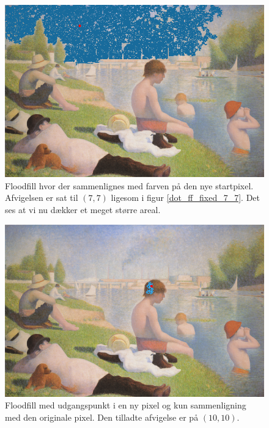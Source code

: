 {\begin{figure}[!h]
    \begin{center}
        \includegraphics[scale=0.49]{afsnit/vores_implementation/billeder/flood_fill/dot_ff_var_7_7}
    \end{center}
    \caption[]{Floodfill hvor der sammenlignes med farven på den nye
    startpixel. Afvigelsen er sat til $(7,7)$ ligesom i figur
    \ref{dot_ff_fixed_7_7}. Det ses at vi nu dækker et meget større
    areal.}
    \label{dot_ff_var_7_7}
\end{figure}

\begin{figure}[!h]
    \begin{center}
        \includegraphics[scale=0.49]{afsnit/vores_implementation/billeder/flood_fill/dot_ff_fixed_10_10}
    \end{center}
    \caption[]{Floodfill med udgangspunkt i en ny pixel og kun
    sammenligning med den originale pixel. Den tilladte afvigelse er på
    $(10,10)$.}
    \label{dot_ff_fixed_10_10}
\end{figure}

}
